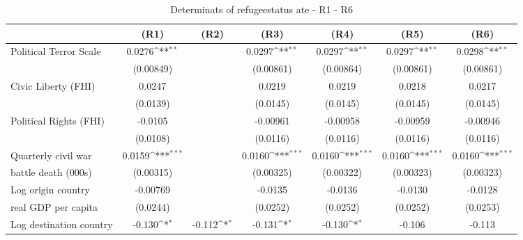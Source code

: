 \begin{table}[!ht]\centering \scriptsize
\def\sym#1{\ifmmode^{#1}\else\(^{#1}\)\fi}
\caption{Determinats of refugeestatus ate - R1 - R6}
\begin{tabular}{l*{6}{c}}
\hline\hline
                   &\multicolumn{1}{c}{(R1)}&\multicolumn{1}{c}{(R2)}&\multicolumn{1}{c}{(R3)}&\multicolumn{1}{c}{(R4)}&\multicolumn{1}{c}{(R5)}&\multicolumn{1}{c}{(R6)}\\
\hline
Political Terror Scale&      0.0276\sym{**} &                     &      0.0297\sym{**} &      0.0297\sym{**} &      0.0297\sym{**} &      0.0298\sym{**} \\
                    &   (0.00849)         &                     &   (0.00861)         &   (0.00864)         &   (0.00861)         &   (0.00861)         \\
[0,5em]
Civic Liberty (FHI) &      0.0247         &                     &      0.0219         &      0.0219         &      0.0218         &      0.0217         \\
                    &    (0.0139)         &                     &    (0.0145)         &    (0.0145)         &    (0.0145)         &    (0.0145)         \\
[0,5em]
Political Rights (FHI)&     -0.0105         &                     &    -0.00961         &    -0.00958         &    -0.00959         &    -0.00946         \\
                    &    (0.0108)         &                     &    (0.0116)         &    (0.0116)         &    (0.0116)         &    (0.0116)         \\
[0,5em]
Quarterly civil war &      0.0159\sym{***}&                     &      0.0160\sym{***}&      0.0160\sym{***}&      0.0160\sym{***}&      0.0160\sym{***}\\
battle death (000s)                    &   (0.00315)         &                     &   (0.00325)         &   (0.00322)         &   (0.00323)         &   (0.00323)         \\
[0,5em]
Log origin country &    -0.00769         &                     &     -0.0135         &     -0.0136         &     -0.0130         &     -0.0128         \\
real GDP per capita                    &    (0.0244)         &                     &    (0.0252)         &    (0.0252)         &    (0.0252)         &    (0.0253)         \\
[0,5em]
Log destination country &      -0.130\sym{*}  &      -0.112\sym{*}  &      -0.131\sym{*}  &      -0.130\sym{*}  &      -0.106         &      -0.113         \\

\end{tabular}
\end{table}
